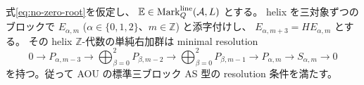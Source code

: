 \begin{proposition}\label{prop:aou-simple-resolution}
式\eqref{eq:no-zero-root}を仮定し、
$\mathbb E\in\operatorname{Mark}^{\rm line}_Q(\mathcal A,L)$ とする。
helix を三対象ずつのブロックで $E_{\alpha,m}$
($\alpha\in\{0,1,2\}$、$m\in\mathbb Z$) と添字付けし、
$E_{\alpha,m+3}=HE_{\alpha,m}$ とする。
その helix $\mathbb Z$-代数の単純右加群は minimal resolution
\begin{equation}\label{eq:aou-cubic-resolution-incoming}
 0\longrightarrow P_{\alpha,m-3}
 \longrightarrow\bigoplus_{\beta=0}^2P_{\beta,m-2}
 \longrightarrow\bigoplus_{\beta=0}^2P_{\beta,m-1}
 \longrightarrow P_{\alpha,m}\longrightarrow S_{\alpha,m}\longrightarrow0
\end{equation}
を持つ。従って AOU の標準三ブロック AS 型の resolution 条件を満たす。
\end{proposition}
